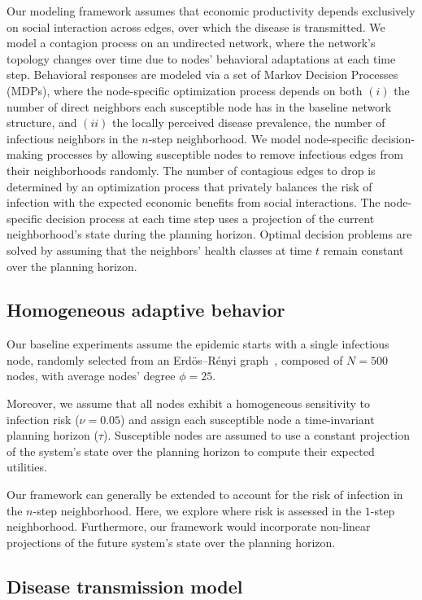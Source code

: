 \documentclass[9pt,twocolumn,twoside]{pnas-new}
\begin{document}
Our modeling framework assumes that economic productivity depends exclusively on social interaction across edges, over which the disease is transmitted. We model a contagion process on an undirected network, where the network's topology changes over time due to nodes' behavioral adaptations at each time step.
%
Behavioral responses are modeled via a set of Markov Decision Processes (MDPs), where the node-specific optimization process depends on both $(i)$ the number of direct neighbors each susceptible node has in the baseline network structure, and $(ii)$ the locally perceived disease prevalence, the number of infectious neighbors in the $n$-step neighborhood.
%
We model node-specific decision-making processes by allowing susceptible nodes to remove infectious edges from their neighborhoods randomly. The number of contagious edges to drop is determined by an optimization process that privately balances the risk of infection with the expected economic benefits from social interactions.
%
The node-specific decision process at each time step uses a projection of the current neighborhood's state during the planning horizon. Optimal decision problems are solved by assuming that the neighbors' health classes at time $t$ remain constant over the planning horizon.

\subsection*{Homogeneous adaptive behavior}
%
Our baseline experiments assume the epidemic starts with a single infectious node, randomly selected from an Erd\"{o}s–R\'{e}nyi graph~\cite{Erdos1960}, composed of $N=500$ nodes, with average nodes' degree $\phi=25$. 

Moreover, we assume that all nodes exhibit a homogeneous sensitivity to infection risk ($\nu=0.05$) and assign each susceptible node a time-invariant planning horizon ($\tau$). Susceptible nodes are assumed to use a constant projection of the system's state over the planning horizon to compute their expected utilities.

Our framework can generally be extended to account for the risk of infection in the $ n$-step neighborhood. Here, we explore where risk is assessed in the $1$-step neighborhood. Furthermore, our framework would incorporate non-linear projections of the future system's state over the planning horizon.

\subsection*{Disease transmission model}
\end{document}
